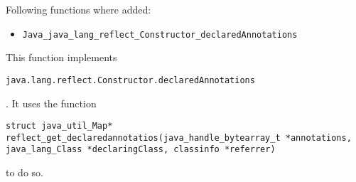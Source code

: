 \documentclass[a4paper, 10pt, titlepage]{scrartcl} %
\begin{document}
Following functions where added:
\begin{itemize}
 \item \begin{scriptsize}\verb|Java_java_lang_reflect_Constructor_declaredAnnotations|\end{scriptsize}
\end{itemize}
This function implements
\begin{scriptsize}\verb|java|\hspace{0.0pt}\verb|.|\hspace{0.0pt}\verb|lang|\hspace{0.0pt}\verb|.|\hspace{0.0pt}\verb|reflect|\hspace{0.0pt}\verb|.|\hspace{0.0pt}\verb|Constructor|\hspace{0.0pt}\verb|.|\hspace{0.0pt}\verb|declaredAnnotations|\end{scriptsize}. It uses the
function \begin{scriptsize}\verb|struct|\hspace{0.0pt}\verb| |\hspace{0.0pt}\verb|java_util_Map|\hspace{0.0pt}\verb|*|\hspace{0.0pt}\verb||\hspace{0.0pt}\verb| |\hspace{0.0pt}\verb|reflect_get_declaredannotatios|\hspace{0.0pt}\verb|(|\hspace{0.0pt}\verb|java_handle_bytearray_t|\hspace{0.0pt}\verb| |\hspace{0.0pt}\verb||\hspace{0.0pt}\verb|*|\hspace{0.0pt}\verb|annotations|\hspace{0.0pt}\verb|,|\hspace{0.0pt}\verb||\hspace{0.0pt}\verb| |\hspace{0.0pt}\verb|java_lang_Class|\hspace{0.0pt}\verb| |\hspace{0.0pt}\verb||\hspace{0.0pt}\verb|*|\hspace{0.0pt}\verb|declaringClass|\hspace{0.0pt}\verb|,|\hspace{0.0pt}\verb||\hspace{0.0pt}\verb| |\hspace{0.0pt}\verb|classinfo|\hspace{0.0pt}\verb| |\hspace{0.0pt}\verb||\hspace{0.0pt}\verb|*|\hspace{0.0pt}\verb|referrer|\hspace{0.0pt}\verb|)|\hspace{0.0pt}\verb||\end{scriptsize} to do so.
\end{document}
